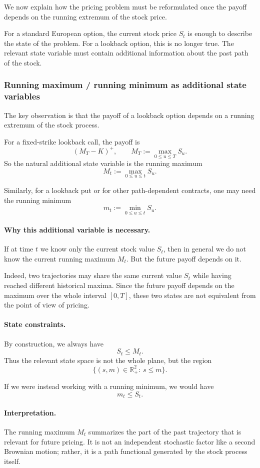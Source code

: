 \documentclass[11pt]{article}
\newcommand{\R}{\mathbb{R}}
\theoremstyle{plain}
\theoremstyle{definition}
\theoremstyle{remark}
\begin{document}
We now explain how the pricing problem must be reformulated once the
payoff depends on the running extremum of the stock price.

For a standard European option, the current stock price \(S_t\) is
enough to describe the state of the problem.
For a lookback option, this is no longer true.
The relevant state variable must contain additional information about
the past path of the stock.

\subsubsection{Running maximum / running minimum as additional state variables}

The key observation is that the payoff of a lookback option depends on a
running extremum of the stock process.

For a fixed-strike lookback call, the payoff is
\[
(M_T-K)^+,
\qquad
M_T:=\max_{0\le u\le T}S_u.
\]
So the natural additional state variable is the running maximum
\[
M_t:=\max_{0\le u\le t}S_u.
\]

Similarly, for a lookback put or for other path-dependent contracts, one
may need the running minimum
\[
m_t:=\min_{0\le u\le t}S_u.
\]

\paragraph{Why this additional variable is necessary.}
If at time \(t\) we know only the current stock value \(S_t\), then in
general we do not know the current running maximum \(M_t\).
But the future payoff depends on it.

Indeed, two trajectories may share the same current value \(S_t\) while
having reached different historical maxima.
Since the future payoff depends on the maximum over the whole interval
\([0,T]\), these two states are not equivalent from the point of view of
pricing.

\paragraph{State constraints.}
By construction, we always have
\[
S_t\le M_t.
\]
Thus the relevant state space is not the whole plane, but the region
\[
\{(s,m)\in\R_+^2:\ s\le m\}.
\]

If we were instead working with a running minimum, we would have
\[
m_t\le S_t.
\]

\paragraph{Interpretation.}
The running maximum \(M_t\) summarizes the part of the past trajectory
that is relevant for future pricing.
It is not an independent stochastic factor like a second Brownian
motion; rather, it is a path functional generated by the stock process
itself.
\end{document}
